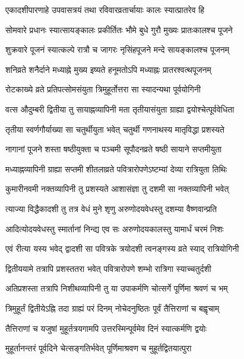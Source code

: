 \twolineshloka
{एकादशीपारणाहे उपवासत्रयं तथा}
{रविवारव्रतार्चायाः कालः स्यात्प्रातरेव हि} %

\twolineshloka
{सोमवारे प्रधानः स्यात्सायङ्कालः प्रकीर्तितः}
{भौमे बुधे गुरौ मुख्यः प्रातःकालश्च पूजने} %

\twolineshloka
{शुक्रवारे पूजनं स्यात्कल्पे रात्रौ च जागरः}
{नृसिंहपूजने मन्दे सायङ्कालश्च पूजनम्} %

\twolineshloka
{शनिव्रते शनैर्दाने मध्याह्ने मुख्य इष्यते}
{हनूमतोऽपि मध्याह्नः प्रातरश्वत्थपूजनम्} %

\twolineshloka
{रोटकाख्ये व्रते प्रतिपत्सोमसंयुता}
{त्रिमुहूर्तोत्तरा सा स्यादन्यथा पूर्वयोगिनी} %

\twolineshloka
{वत्स औदुम्बरी द्वितीया तु सायाह्नव्यापिनी मता}
{तृतीयासंयुता ग्राह्या द्वयोश्चेत्पूर्ववेधिता} %

\twolineshloka
{तृतीया स्वर्णगौर्याख्या सा चतुर्थीयुता भवेत्}
{चतुर्थी गणनाथस्य मातृविद्धा प्रशस्यते} %

\twolineshloka
{नागानां पूजने शस्ता षष्ठीयुक्ता च पञ्चमी}
{सूपौदनव्रते षष्ठी सायाने सप्तमीयुता} %

\twolineshloka
{मध्याह्नव्यापिनी ग्राह्या सप्तमी शीतलाव्रते}
{पवित्रारोपणेऽष्टम्यां देव्या रात्रियुता तिथिः} %

\twolineshloka
{कुमारीनवमी नक्तव्यापिनी तु प्रशस्यते}
{आशासंज्ञा तु दशमी सा नक्तव्यापिनी भवेत्} %

\twolineshloka
{त्याज्या विद्धैकादशी तु तत्र वेधं मुने शृणु}
{अरुणोदयवेधस्तु दशम्या वैष्णवान्प्रति} %

\twolineshloka
{आदित्योदयवेधस्तु स्मार्तानां निन्द्य एव सः}
{अरुणोदयकालस्तु यामार्धं चरमं निशः} %

\twolineshloka
{एवं रीत्या यस्य भवेद् द्वादशी सा पवित्रके}
{त्रयोदशी त्वनङ्गस्य व्रते स्याद् रात्रियोगिनी} %

\twolineshloka
{द्वितीययामे तत्रापि प्रशस्ततरा भवेत्}
{पवित्रारोपणे शम्भो रात्रिगा स्याच्चतुर्दशी} %

\twolineshloka
{अतिप्रशस्ता तत्रापि निशीथव्यापिनी तु या}
{उपाकर्मणि चोत्सर्गे पूर्णिमा श्रवणं च भम्} %

\twolineshloka
{त्रिमुहूर्तं द्वितीयेऽह्नि तदा ग्राह्यं परं दिनम्}
{नोचेदनुष्ठितः पूर्वं तैत्तिराणां च बह्वृचाम्} %

\twolineshloka
{तैत्तिराणां च यजुषां मुहूर्तत्रयगामपि}
{उत्तरस्मिन्पूर्वमेव दिनं स्यात्कर्मणि द्वयोः} %

\twolineshloka
{मुहूर्तानन्तरं पूर्वदिने चेत्सङ्गतिर्भवेत्}
{पूर्णिमाश्रवण च मुहूर्तद्वितयात्पुरा} %

